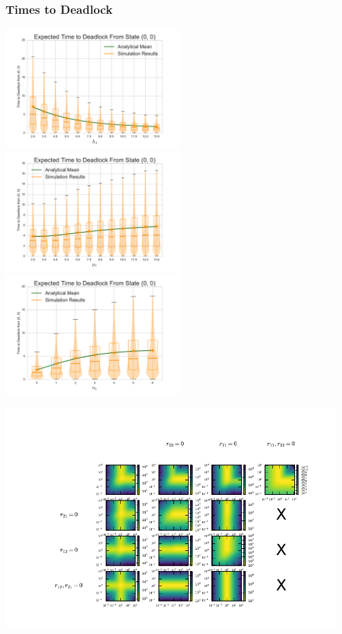 \documentclass[xcolor={table}]{beamer}
\begin{document}
\begin{frame}
    \frametitle{Times to Deadlock}
    \includegraphics[width=0.5\textwidth]{../images/vary_L1fb}
    \includegraphics[width=0.5\textwidth]{../images/vary_mu1fb}\newline
    \centering
    \includegraphics[width=0.5\textwidth]{../images/vary_n1fb}
\end{frame}

\begin{frame}
\begin{center}
\includegraphics[width=0.95\textwidth]{../images/muslimit_allcombinations.pdf}
\end{center}
\end{frame}
\end{document}
